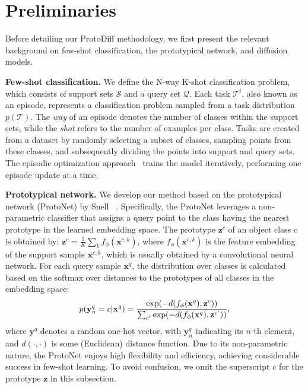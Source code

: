 \section{Preliminaries}

Before detailing our ProtoDiff methodology, we first present the relevant background on few-shot classiﬁcation, the prototypical network, and diffusion models.

\textbf{Few-shot classification.} We define the N-way K-shot classification problem, which consists of support sets $\mathcal{S}$ and a query set $\mathcal{Q}$. Each task $\mathcal{T}^i$, also known as an episode, represents a classification problem sampled from a task distribution $p(\mathcal{T})$. The \textit{way} of an episode denotes the number of classes within the support sets, while the \textit{shot} refers to the number of examples per class. Tasks are created from a dataset by randomly selecting a subset of classes, sampling points from these classes, and subsequently dividing the points into support and query sets. The episodic optimization approach~\cite{vinyals2016matching} trains the model iteratively, performing one episode update at a time.

\textbf{Prototypical network.} We develop our method based on the prototypical network (ProtoNet) by Snell \etal~\cite{snell2017prototypical}. Specifically, the ProtoNet leverages a non-parametric classifier that assigns a query point to the class having the nearest prototype in the learned embedding space. The prototype $\mathbf{z}^c$ of an object class $c$ is obtained by: $\mathbf{z}^c {=} \frac{1}{K}\sum_k f_{\phi}(\mathbf{x}^{c,k})$, where $f_{\phi}(\mathbf{x}^{c,k})$ is the feature embedding of the support sample $\mathbf{x}^{c,k}$, which is usually obtained by a convolutional neural network. For each query sample $\mathbf{x}^q$, the distribution over classes is calculated based on the softmax over distances to the prototypes of all classes in the embedding space:
\begin{equation}
\small
\label{eqn:protonetProb}
    p(\mathbf{y}_{n}^q = c|\mathbf{x}^q) = \frac{\exp(-d(f_{\phi}(\mathbf{x}^q),\mathbf{z}^c))}{\sum_{c'} \exp(-d(f_{\phi}(\mathbf{x}^q),\mathbf{z}^{c'}))},
\end{equation}
where $\mathbf{y}^q$ denotes a random one-hot vector, with $\mathbf{y}_n^q$ indicating its $n$-th element, and $d(\cdot,\cdot)$ is some (Euclidean) distance function. Due to its non-parametric nature, the ProtoNet enjoys high flexibility and efficiency, achieving considerable success in few-shot learning.  To avoid confusion, we omit the superscript $c$ for the prototype $\mathbf{z}$ in this subsection.

